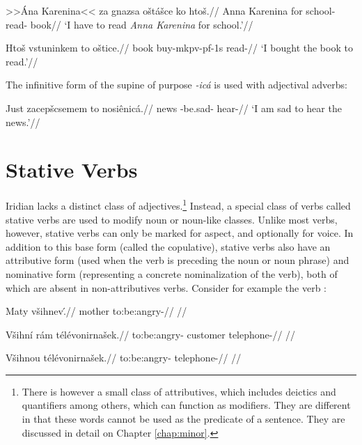 	\pex
\begingl
\gla >>Ána Karenina<< za gnazsa o\v{s}tá\v{s}ce ko hto\v{s}.//
\glb Anna Karenina for school- read-  book//
\glft `I have to read \textit{Anna Karenina} for school.'//
\endgl
\xe

	\pex
\begingl
\gla Hto\v{s} vstuninkem to o\v{s}tice.//
\glb book buy-mk{pv-pf-1s}  read-//
\glft `I bought the book to read.'//
\endgl
\xe

\par The infinitive form of the supine of purpose \textit{-icá} is used with adjectival adverbs:

\pex
\begingl
\gla Just zacep\v{s}csemem to nosiênicá.//
\glb news -be.sad-  hear-//
\glft `I am sad to hear the news.'//
\endgl
\xe


\section{Stative Verbs}

Iridian lacks a distinct class of adjectives.\footnote{There is however a small class of attributives, which includes deictics and quantifiers among others, which can function as modifiers. They are different in that these words cannot be used as the predicate of a sentence. They are discussed in detail on Chapter \ref{chap:minor}.} Instead, a special class of verbs called stative verbs are used to modify noun or noun-like classes. Unlike most verbs, however, stative verbs can only be marked for aspect, and optionally for voice. In addition to this base form (called the copulative), stative verbs also have an attributive form (used when the verb is preceding the noun or noun phrase) and nominative form (representing a concrete nominalization of the verb), both of which are absent in non-attributives verbs. Consider for example the verb  :

\pex
\a
\begingl
\gla Maty v\v{s}ihnev\'.//
\glb mother to:be:angry-//
\glft {}//
\endgl

\a
\begingl
\gla V\v{s}ihn\'i r\'am t\'el\'evonirna\v{s}ek.//
\glb to:be:angry- customer telephone-//
\glft {}//
\endgl

\a
\begingl
\gla V\v{s}ihnou t\'el\'evonirna\v{s}ek.//
\glb to:be:angry- telephone-//
\glft {}//
\endgl

